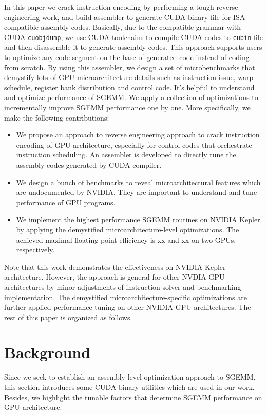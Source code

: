 \documentclass{sig-alternate-05-2015}
\begin{document}
In this paper we crack instruction encoding by performing a tough reverse engineering work, and build assembler to generate CUDA binary file for ISA-compatible assembly codes. Basically, due to the compatible grammar with CUDA {\tt cuobjdump}, we use CUDA toolchains to compile CUDA codes to {\tt cubin} file and then disassemble it to generate assembly codes. This approach supports users to optimize any code segment on the base of generated code instead of coding from scratch. By using this assembler, we design a set of microbenchmarks that demystify lots of GPU microarchitecture details such as instruction issue, warp schedule, register bank distribution and control code. It's helpful to understand and optimize performance of SGEMM. We apply a collection of optimizations to incrementally improve SGEMM performance one by one. More specifically, we make the following contributions:
\begin{itemize}
\item We propose an approach to reverse engineering approach to crack instruction encoding of GPU architecture, especially for control codes that orchestrate instruction scheduling. An assembler is developed to directly tune the assembly codes generated by CUDA compiler.
\item We design a bunch of benchmarks to reveal microarchitectural features which are undocumented by NVIDIA. They are important to understand and tune performance of GPU programs.
\item We implement the highest performance SGEMM routines on NVIDIA Kepler by applying the demystified microarchitecture-level optimizations. The achieved maximal floating-point efficiency is xx and xx on two GPUs, respectively.
\end{itemize}

Note that this work demonstrates the effectiveness on NVIDIA Kepler architecture. However, the approach is general for other NVDIA GPU architectures by minor  adjustments of instruction solver and benchmarking implementation. The demystified microarchitecture-specific optimizations are further applied performance tuning on other NVIDIA GPU architectures. The rest of this paper is organized as follows.

\section{Background}
Since we seek to establish an assembly-level optimization approach to SGEMM, this section introduces some CUDA binary utilities which are used in our work. Besides, we highlight the tunable factors that determine SGEMM performance on GPU architecture.
\end{document}
